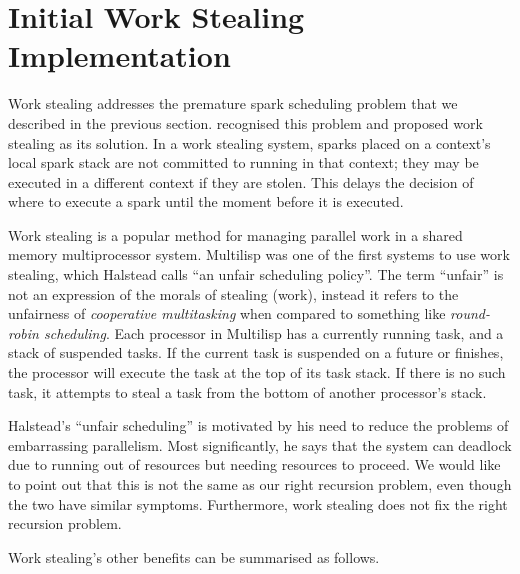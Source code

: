 
\section{Initial Work Stealing Implementation}
\label{sec:rts_work_stealing}

Work stealing addresses the premature spark scheduling problem that we
described in the previous section.
\citet{wang:2006:hons} recognised this problem and proposed work stealing as
its solution.
In a work stealing system,
sparks placed on a context's local spark stack
are not committed to running in that context;
they may be executed in a different context if they are stolen.
This delays the decision of where to execute a spark until the moment
before it is executed.

Work stealing is a popular method for managing parallel work in a shared
memory multiprocessor system.
Multilisp \citep{halstead:1985:multilisp} was one of the first systems to
use work stealing,
which Halstead calls ``an unfair scheduling policy''.
The term ``unfair'' is not an expression of the morals of stealing (work),
instead it refers to the unfairness of \emph{cooperative multitasking} when
compared to something like \emph{round-robin scheduling}.
Each processor in Multilisp has a currently running task,
and a stack of suspended tasks.
If the current task is suspended on a future or finishes,
the processor will execute the task at the top of its task stack.
If there is no such task,
it attempts to steal a task from the bottom of another processor's stack.

Halstead's ``unfair scheduling'' is motivated by his need to reduce the
problems of embarrassing parallelism.
Most significantly,
he says that the system can deadlock due to running out of resources but
needing resources to proceed.
We would like to point out that
this is not the same as our right recursion problem,
even though the two have similar symptoms.
Furthermore,
work stealing does not fix the right recursion problem.

Work stealing's other benefits can be summarised as follows.

